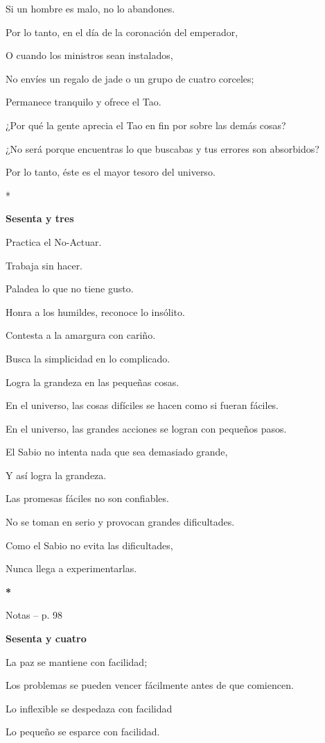 Si un hombre es malo, no lo abandones.

Por lo tanto, en el día de la coronación del emperador,

O cuando los ministros sean instalados,

No envíes un regalo de jade o un grupo de cuatro corceles;

Permanece tranquilo y ofrece el Tao.

¿Por qué la gente aprecia el Tao en fin por sobre las demás cosas?

¿No será porque encuentras lo que buscabas y tus errores son absorbidos?

Por lo tanto, éste es el mayor tesoro del universo.

*

\textbf{Sesenta y tres}

Practica el No-Actuar.

Trabaja sin hacer.

Paladea lo que no tiene gusto.

Honra a los humildes, reconoce lo insólito.

Contesta a la amargura con cariño.

Busca la simplicidad en lo complicado.

Logra la grandeza en las pequeñas cosas.

En el universo, las cosas difíciles se hacen como si fueran fáciles.

En el universo, las grandes acciones se logran con pequeños pasos.

El Sabio no intenta nada que sea demasiado grande,

Y así logra la grandeza.

Las promesas fáciles no son confiables.

No se toman en serio y provocan grandes dificultades.

Como el Sabio no evita las dificultades,

Nunca llega a experimentarlas.

\textbf{*}

Notas -- p. 98

\textbf{Sesenta y cuatro}

La paz se mantiene con facilidad;

Los problemas se pueden vencer fácilmente antes de que comiencen.

Lo inflexible se despedaza con facilidad

Lo pequeño se esparce con facilidad.

